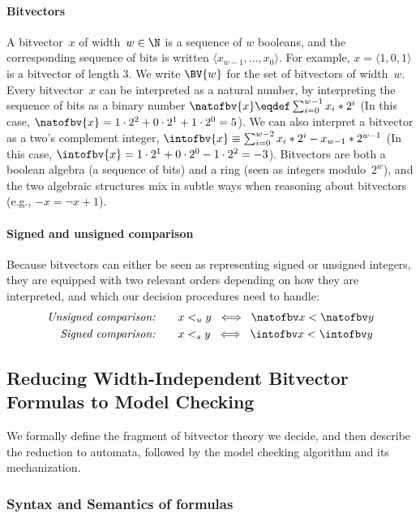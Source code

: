 \paragraph{Bitvectors}
A bitvector~$x$ of width~$w \in \N$ is a sequence of $w$ booleans, and the
corresponding sequence of bits is written $\langle x_{w-1}, \ldots, x_0
\rangle$. For example, $x = \langle 1, 0, 1 \rangle$ is a bitvector of length 3.
%
We write $\BV{w}$ for the set of bitvectors of width~$w$.
%
Every bitvector~$x$ can be interpreted as a natural number, by interpreting the
sequence of bits as a binary number $\natofbv{x} \eqdef \sum_{i=0}^{w-1} x_i *
2^i$ (In this case, $\natofbv{x} = 1 \cdot 2^2 + 0 \cdot 2^1 + 1 \cdot 2^0 =
5$). We can also interpret a bitvector as a two's complement integer,
$\intofbv{x} \equiv \sum_{i=0}^{w-2} x_i * 2^i - x_{w-1} * 2^{w-1}$ (In this
case, $\intofbv{x} = 1 \cdot 2^1 + 0 \cdot 2^0 - 1 \cdot 2^2 = -3$). Bitvectors
are both a boolean algebra (a sequence of bits) and a ring (seen as integers
modulo~$2^w$), and the two algebraic structures mix in subtle ways when reasoning
about bitvectors (e.g., $-x = \lnot x + 1$).

\paragraph{Signed and unsigned comparison}
Because bitvectors can either be seen as representing signed or unsigned
integers, they are equipped with two relevant orders depending on how they are
interpreted, and which our decision procedures need to handle:
\begin{align*}
  \textit{Unsigned comparison:}&\qquad x <_u y \;\iff\; \natofbv x < \natofbv y \\
  \textit{Signed comparison:}&\qquad x <_s y \;\iff\; \intofbv x < \intofbv y
\end{align*}

\subsection{Reducing Width-Independent Bitvector Formulas to Model Checking}
\label{sec:swbv:reduction}

We formally define the fragment of bitvector theory we decide,
and then describe the reduction to automata, followed by the model checking algorithm and its mechanization.

\subsubsection{Syntax and Semantics of formulas}
\label{sec:swbv:formulas}

